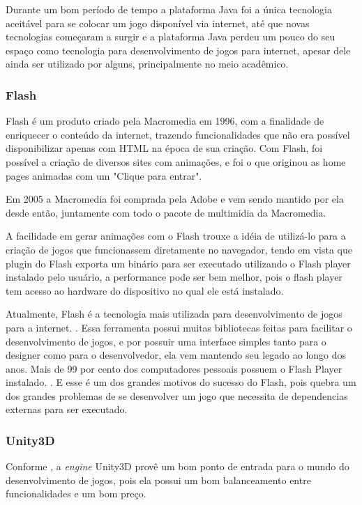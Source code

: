 Durante um bom período de tempo a plataforma Java foi a única tecnologia
aceitável para se colocar um jogo disponível via internet, até que
novas tecnologias começaram a surgir e a plataforma Java perdeu um pouco do seu
espaço como tecnologia para desenvolvimento de jogos para internet,
apesar dele ainda ser utilizado por alguns, principalmente no meio
acadêmico.

\subsubsection{Flash}

Flash é um produto criado pela Macromedia em 1996, com a finalidade de
enriquecer o conteúdo da internet, trazendo funcionalidades que não
era possível disponibilizar apenas com HTML na época de sua criação.
Com Flash, foi possível a criação de diversos sites com animações, e
foi o que originou as home pages animadas com um "Clique para entrar".

Em 2005 a Macromedia foi comprada pela Adobe e vem sendo mantido por
ela desde então, juntamente com todo o pacote de multimidia da
Macromedia.

A facilidade em gerar animações com o Flash trouxe a idéia de
utilizá-lo para a criação de jogos que funcionassem diretamente no
navegador, tendo em vista que plugin do Flash exporta um binário para ser
executado utilizando o Flash player instalado pelo usuário, a
performance pode ser bem melhor, pois o flash player tem acesso ao
hardware do dispositivo no qual ele está instalado.

Atualmente, Flash é a tecnologia mais utilizada para desenvolvimento de jogos para a
internet. \cite{website:adobeflashleading}. Essa ferramenta possui muitas
bibliotecas feitas para facilitar o desenvolvimento de jogos, e por
possuir uma interface simples tanto para o designer como para o desenvolvedor,
ela vem mantendo seu legado ao longo dos anos.
Mais de 99 por cento dos computadores pessoais possuem o Flash Player
instalado. \cite{website:adobeflashpenetration}. E esse é um dos grandes
motivos do sucesso do Flash, pois quebra um dos grandes problemas de
se desenvolver um jogo que necessita de dependencias externas para ser
executado.

\subsubsection{Unity3D}

Conforme , a \textit{engine} Unity3D provê
um bom ponto de entrada para o mundo do desenvolvimento de jogos, pois
ela possui um bom balanceamento entre funcionalidades e um bom preço.

